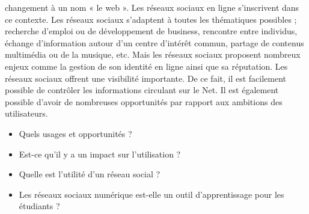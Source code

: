 \documentclass[12pt,a4paper,titlepage]{article}
\begin{document}
changement à un nom « le web ». Les réseaux sociaux en ligne s’inscrivent dans ce contexte. \newline
Les réseaux sociaux s’adaptent à toutes les thématiques possibles ; recherche d’emploi ou de
développement de business, rencontre entre individus, échange d’information autour d’un
centre d’intérêt commun, partage de contenus multimédia ou de la musique, etc. Mais les
réseaux sociaux proposent nombreux enjeux comme la gestion de son identité en ligne ainsi
que sa réputation. Les réseaux sociaux offrent une visibilité importante. De ce fait, il est
facilement possible de contrôler les informations circulant sur le Net. Il est également possible
d’avoir de nombreuses opportunités par rapport aux ambitions des utilisateurs. \newline
\begin{itemize}
    \item Quels usages et opportunités ?
    \item Est-ce qu’il y a un impact sur l’utilisation ?
    \item Quelle est l’utilité d’un réseau social ?
    \item Les réseaux sociaux numérique est-elle un outil d’apprentissage pour les étudiants ?
\end{itemize}
\end{document}
